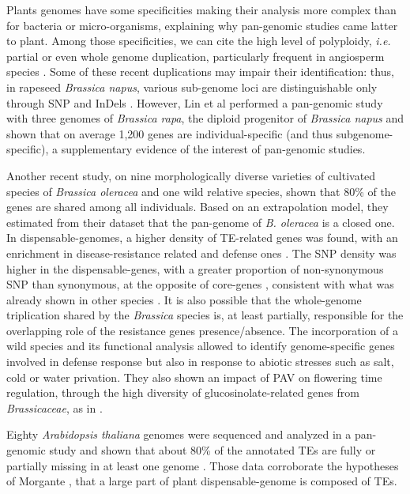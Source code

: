 \documentclass[a4paper,10pt,twoside]{report}
\begin{document}
Plants genomes have some specificities making their analysis more complex than for bacteria or micro-organisms, explaining why pan-genomic studies came latter to plant. Among those specificities, we can cite the high level of polyploidy, \textit{i.e.} partial or even whole genome duplication, particularly frequent in angiosperm species \cite{Cheung2009}. Some of these recent duplications may impair their identification: thus, in rapeseed \emph{Brassica napus}, various sub-genome loci are distinguishable only through SNP and InDels \cite{Cheung2009}. However, Lin et al \cite{Lin2014a} performed a pan-genomic study with three genomes of \emph{Brassica rapa}, the diploid progenitor of \emph{Brassica napus} and shown that on average 1,200 genes are individual-specific (and thus subgenome-specific), a supplementary evidence of the interest of pan-genomic studies.

Another recent study, on nine morphologically diverse varieties of cultivated species of \emph{Brassica oleracea} \cite{Golicz2016a} and one wild relative species, shown that 80\% of the genes are shared among all individuals. Based on an extrapolation model, they estimated from their dataset that the pan-genome of \emph{B. oleracea} is a closed one. In dispensable-genomes, a higher density of TE-related genes was found, with an enrichment in disease-resistance related and defense ones \cite{Schatz2014,Gordon2017}. The SNP density was higher in the dispensable-genes, with a greater proportion of non-synonymous SNP than synonymous, at the opposite of core-genes \cite{Golicz2016a}, consistent with what was already shown in other species \cite{Schatz2014}. It is also possible that the whole-genome triplication shared by the \textit{Brassica} species is, at least partially, responsible for the overlapping role of the resistance genes presence/absence.
The incorporation of a wild species and its functional analysis allowed \cite{Golicz2016a} to identify genome-specific genes involved in defense response but also in response to abiotic stresses such as salt, cold or water privation. They also shown an impact of PAV on flowering time regulation, through the high diversity of glucosinolate-related genes from \textit{Brassicaceae}, as in \cite{Lin2014a}.

Eighty \emph{Arabidopsis thaliana} genomes were sequenced and analyzed in a pan-genomic study and shown that about 80\% of the annotated TEs are fully or partially missing in at least one genome \cite{Cao2011}. Those data corroborate the hypotheses of Morgante \cite{Morgante2007}, that a large part of plant dispensable-genome is composed of TEs.\\
\end{document}
